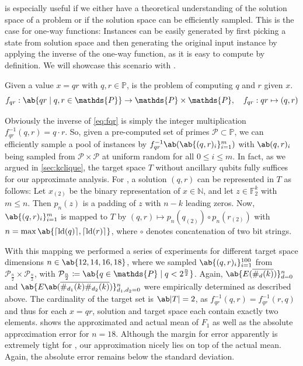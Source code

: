  is especially useful if we either have a theoretical understanding of the solution space of a problem or if the solution space can be efficiently sampled. This is the case for one-way functions: Instances can be easily generated by first picking a state from solution space and then generating the original input instance by applying the inverse of the one-way function, as it is easy to compute by definition. We will showcase this scenario with \qrfactoring.
\begin{definition}
    Given a value $x = qr$ with $q, r \in \mathds{P}$, \qrfactoring is the problem of computing $q$ and $r$ given $x$.
    \begin{equation}
        \label{eq:fqr}
        f_{qr} : \ab\{qr \mid q, r \in \mathds{P}\} \to \mathds{P} \times \mathds{P} ,\quad f_{qr} : qr \mapsto (q,r)
    \end{equation}
\end{definition}
Obviously the inverse of \cref{eq:fqr} is simply the integer multiplication $f_{qr}^{-1}(q,r) = q \cdot r$. So, given a pre-computed set of primes $\mathcal{P} \subset \mathds{P}$, we can efficiently sample a pool of \qrfactoring instances by $f_{qr}^{-1} \ab(\ab\{(q,r)_i\}_{i=1}^m)$ with $\ab(q,r)_i$ being sampled from $\mathcal{P} \times \mathcal{P}$ at uniform random for all $0 \leq i \leq m$. In fact, as we argued in \cref{sec:kclique}, the target space $T$ without ancillary qubits fully suffices for our approximate analysis. For \qrfactoring, a solution $(q,r)$ can be represented in $T$ as follows: Let $x_{(2)}$ be the binary representation of $x \in \mathds{N}$, and let $z \in \mathds{F}_2^{k}$ with $m \leq n$. Then $p_n(z)$ is a padding of $z$ with $n - k$ leading zeros. Now, $\ab\{(q,r)_i\}_{i = 1}^m$ is mapped to $T$ by $(q,r) \mapsto p_n(q_{(2)}) \circ p_n(r_{(2)})$ with $n = \max\ab\{\lceil \lb(q) \rceil, \lceil \lb(r) \rceil\}$, where $\circ$ denotes concatenation of two bit strings.

With this mapping we performed a series of experiments for different target space dimensions $n \in \ab\{12, 14, 16, 18\}$, where we sampled $\ab\{(q,r)_i\}_{i = 1}^{100}$ from $\mathcal{P}_{\frac{n}{2}} \times \mathcal{P}_{\frac{n}{2}}$, with $\mathcal{P}_{\frac{n}{2}} \coloneqq \ab\{q \in \mathds{P} \mid q < 2^{\frac{n}{2}} \}$. Again, $\ab\{E(\overline{\#_d (k)})\}_{d=0}^n$ and $\ab\{E\ab(\overline{\#_{d_1} (k) \#_{d_2} (k)})\}_{d_1, d_2 = 0}^n$ were empirically determined as described above. The cardinality of the target set is $\ab|T| = 2$, as $f_{qr}^{-1}(q,r) = f_{qr}^{-1}(r,q)$ and thus for each $x = qr$, solution and target space each contain exactly two elements.  shows the approximated and actual mean of $F_1$ as well as the absolute approximation error for $n = 18$. Although the margin for error apparently is extremely tight for \qrfactoring, our approximation nicely lies on top of the actual mean. Again, the absolute error remains below the standard deviation. 

